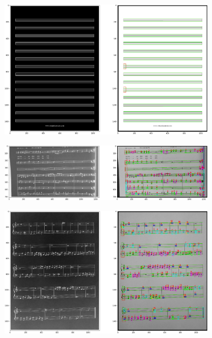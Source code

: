 \documentclass[12pt]{article}
\begin{document}
\begin{enumerate}
\begin{figure}[h!]
\begin{subfigure}[b]{0.48\linewidth}
				\end{subfigure}
				\begin{subfigure}[b]{0.48\linewidth}
					\includegraphics[width=\linewidth]{Eazy/Zdj12.png}
				\end{subfigure}
				\begin{subfigure}[b]{0.48\linewidth}
					\includegraphics[width=\linewidth]{Eazy/Zdj13.png}
				\end{subfigure}
				\begin{subfigure}[b]{0.48\linewidth}
					\includegraphics[width=\linewidth]{Eazy/Zdj14.png}
				\end{subfigure}

\end{figure}
\end{enumerate}
\end{document}
